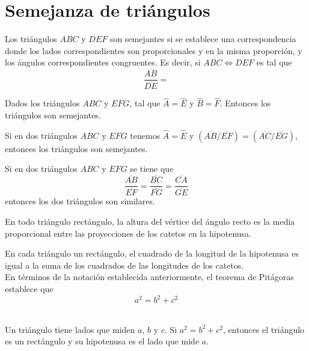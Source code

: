 \chapter{Semejanza de triángulos}

    \begin{def.}
	Los triángulos $ABC$ y $DEF$ son semejantes si se establece una correspondencia donde los lados correspondientes son proporcionales y en la misma proporción, y los ángulos correspondientes congruentes. Es decir, si $ABC \Longleftrightarrow DEF$ es tal que
	$$\dfrac{\overline{AB}}{\overline{DE}} = $$
    \end{def.}

    \begin{teo}[AA]
	Dados los triángulos $ABC$ y $EFG$, tal que $\widehat{A}=\widehat{E}$ y $\widehat{B} = \widehat{F}$. Entonces los triángulos son semejantes.\\
    \end{teo}
    
    \begin{teo}
	Si en dos triángulos $ABC$ y $EFG$ tenemos $\widehat{A} = \widehat{E}$ y $(\overline{AB}/\overline{EF}) = (\overline{AC} / \overline{EG})$, entonces los triángulos son semejantes.\\
    \end{teo}

    \begin{teo}
	Si en dos triángulos $ABC$ y $EFG$ se tiene que $$\dfrac{\overline{AB}}{\overline{EF}}=\dfrac{\overline{BC}}{\overline{FG}}=\dfrac{\overline{CA}}{\overline{GE}}$$ entonces los dos triángulos son similares.\\	
    \end{teo}

	\begin{proposicion}
	    En todo triángulo rectángulo, la altura del vértice del ángulo recto es la media proporcional entre las proyecciones de los catetos en la hipotenusa.\\
	\end{proposicion}

	\begin{teo}[Pitágoras]
	    En cada triángulo un rectángulo, el cuadrado de la longitud de la hipotenusa es igual a la suma de los cuadrados de las longitudes de los catetos.\\ En términos de la notación establecida anteriormente, el teorema de Pitágoras establece que $$a^2=b^2+c^2$$\\
	\end{teo}

	\begin{proposicion}
	    Un triángulo tiene lados que miden $a$, $b$ y $c$. Si $a^2 = b^2 + c^2$, entonces el triángulo es un rectángulo y su hipotenusa es el lado que mide $a$.\\
	\end{proposicion}
